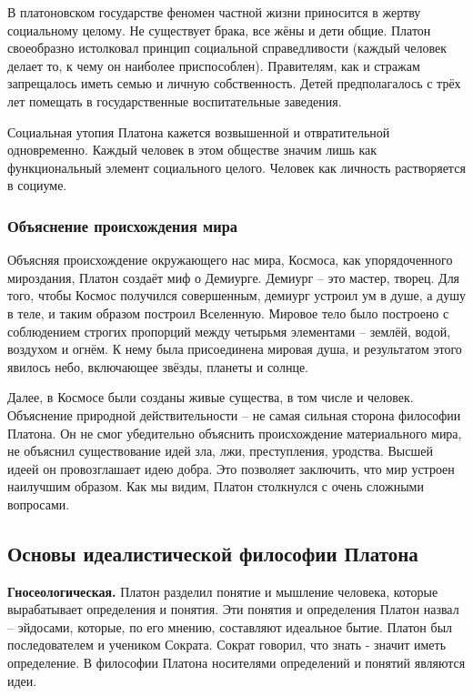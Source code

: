 \documentclass[a4paper, 14pt]{extreport}
\begin{document}
В платоновском государстве феномен частной жизни приносится в жертву
социальному целому. Не существует брака, все жёны и дети общие. Платон
своеобразно истолковал принцип социальной справедливости (каждый человек
делает то, к чему он наиболее приспособлен). Правителям, как и стражам
запрещалось иметь семью и личную собственность. Детей предполагалось с
трёх лет помещать в государственные воспитательные заведения.

Социальная утопия Платона кажется возвышенной и отвратительной
одновременно. Каждый человек в этом обществе значим лишь как
функциональный элемент социального целого. Человек как личность
растворяется в социуме.

\subsubsection{Объяснение происхождения мира}

Объясняя происхождение окружающего нас мира, Космоса, как упорядоченного
мироздания, Платон создаёт миф о Демиурге. Демиург -- это мастер,
творец. Для того, чтобы Космос получился совершенным, демиург устроил ум
в душе, а душу в теле, и таким образом построил Вселенную. Мировое тело
было построено с соблюдением строгих пропорций между четырьмя элементами
-- землёй, водой, воздухом и огнём. К нему была присоединена мировая
душа, и результатом этого явилось небо, включающее звёзды, планеты и
солнце.

Далее, в Космосе были созданы живые существа, в том числе и человек.
Объяснение природной действительности -- не самая сильная сторона
философии Платона. Он не смог убедительно объяснить происхождение
материального мира, не объяснил существование идей зла, лжи,
преступления, уродства. Высшей идеей он провозглашает идею добра. Это
позволяет заключить, что мир устроен наилучшим образом. Как мы видим,
Платон столкнулся с очень сложными вопросами.

\subsection{Основы идеалистической философии Платона}

\textbf{Гносеологическая.} Платон разделил понятие и мышление человека,
которые вырабатывает определения и понятия. Эти понятия и определения
Платон назвал -- эйдосами, которые, по его мнению, составляют идеальное
бытие. Платон был последователем и учеником Сократа. Сократ говорил, что
знать - значит иметь определение. В философии Платона носителями
определений и понятий являются идеи.
\end{document}
